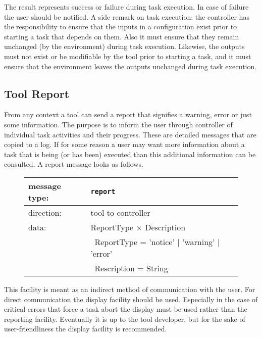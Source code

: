 \documentclass{article}
\newcommand{\msg}[1]{\texttt{#1}}
\begin{document}
   \noindent The result represents success or failure during task execution. In
   case of failure the user should be notified. A side remark on task
   execution: the controller has the responsibility to ensure that the inputs
   in a configuration exist prior to starting a task that depends on them. Also
   it must ensure that they remain unchanged (by the environment) during task
   execution. Likewise, the outputs must not exist or be modifiable by the tool
   prior to starting a task, and it must ensure that the environment leaves the
   outputs unchanged during task execution.

  \subsection{Tool Report}

   From any context a tool can send a report that signifies a warning, error or
   just some information. The purpose is to inform the user through controller
   of individual task activities and their progress. These are detailed
   messages that are copied to a log. If for some reason a user may want more
   information about a task that is being (or has been) executed than this
   additional information can be consulted. A report message looks as follows.
   
   \begin{figure}[H]
    \begin{center}
     \begin{tabular}{|ll|}
      \hline
       message type:   & \msg{report} \\
      \hline
       direction:      & tool to controller \\
       data:           & ReportType $\times$ Description \\
                       & \ ReportType = 'notice' $|$ 'warning' $|$ 'error' \\
                       & \ Rescription = String \\
      \hline
     \end{tabular}
    \end{center}
   \end{figure}
   \vspace{-0.3cm}

   \noindent This facility is meant as an indirect method of communication with
   the user.  For direct communication the display facility should be used.
   Especially in the case of critical errors that force a task abort the
   display must be used rather than the reporting facility. Eventually it is up
   to the tool developer, but for the sake of user-friendliness the display
   facility is recommended.
\end{document}
